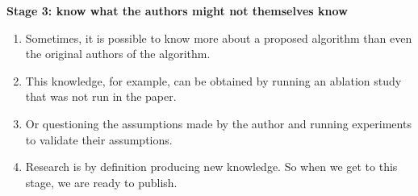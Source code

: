 \documentclass[11pt]{article}
\begin{document}
\textbf{Stage 3: know what the authors might not themselves know}

\begin{enumerate}
	\item Sometimes, it is possible to know more about a proposed algorithm than even the original authors of the algorithm.
	\item This knowledge, for example, can be obtained by running an ablation study that was not run in the paper.
	\item Or questioning the assumptions made by the author and running experiments to validate their assumptions.
	\item Research is by definition producing new knowledge. So when we get to this stage, we are ready to publish.
\end{enumerate}
\end{document}
